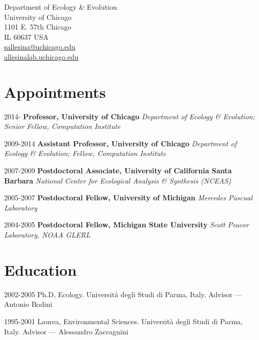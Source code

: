 \documentclass[letterpaper]{article}
\begin{document}
\pagestyle{empty}

 \hfill 

\smallskip

\noindent \begin{flushright}
Department of Ecology \& Evolution\\
University of Chicago\\
1101 E. 57th Chicago\\
IL 60637 USA\\
\href{mailto:sallesina@uchicago.edu}{sallesina@uchicago.edu}\\
\href{http://allesinalab.uchicago.edu}{allesinalab.uchicago.edu}
\end{flushright}

\section*{Appointments}
\begin{CV}[2]{-0.5ex}
\item[2014-] \textbf{Professor, University of Chicago}
    \textit{Department of Ecology \& Evolution; Senior Fellow, Computation Institute}

\item[2009-2014] \textbf{Assistant Professor, University of Chicago}
    \textit{Department of Ecology \& Evolution; Fellow, Computation Institute}

\item[2007-2009] \textbf{Postdoctoral Associate, University of California Santa Barbara}
    \textit{National Center for Ecological Analysis \& Synthesis (NCEAS)}

\item[2005-2007] \textbf{Postdoctoral Fellow, University of Michigan}
    \textit{Mercedes Pascual Laboratory}
        
\item[2004-2005] \textbf{Postdoctoral Fellow, Michigan State University}
    \textit{Scott Peacor Laboratory, NOAA GLERL}
\end{CV}

\section*{Education}
\begin{CV}[2]{-0.5ex}
\item[2002-2005] Ph.D, Ecology. Universit\`a degli Studi di Parma, Italy. Advisor --- Antonio Bodini
\item[1995-2001] Laurea, Environmental Sciences. Universit\`a degli Studi di Parma, Italy. Advisor --- Alessandro Zaccagnini
\end{CV}
\end{document}
